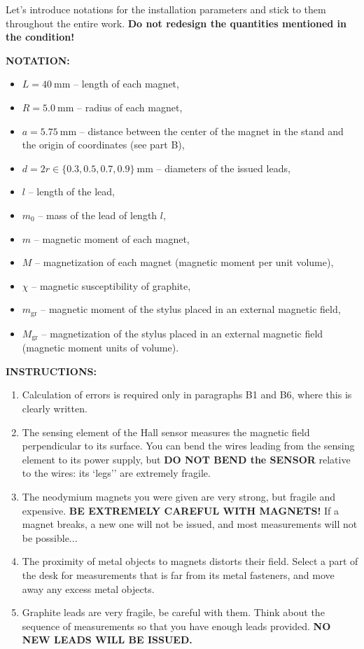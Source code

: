 \documentclass[11pt,a4paper]{article}
\begin{document}
Let's introduce notations for the installation parameters and stick to them throughout the entire work. \textbf{Do not redesign the quantities mentioned in the condition!}

\textbf{NOTATION:}
\begin{itemize}
    \item $L=40~\text{mm}$ -- length of each magnet,
    \item $R=5.0~\text{mm}$ -- radius of each magnet,
    \item $a=5.75~\text{mm}$ -- distance between the center of the magnet in the stand and the origin of coordinates (see part B),
    \item $d=2r \in \{0.3, 0.5, 0.7, 0.9\}~\text{mm}$ -- diameters of the issued leads,
    \item $l$ -- length of the lead,
    \item $m_0$ -- mass of the lead of length $l$,
    \item $m$ -- magnetic moment of each magnet,
    \item $M$ -- magnetization of each magnet (magnetic moment per unit volume),
    \item $\chi$ -- magnetic susceptibility of graphite,
    \item $m_{\text{gr}}$ -- magnetic moment of the stylus placed in an external magnetic field,
    \item $M_{\text{gr}}$ -- magnetization of the stylus placed in an external magnetic field (magnetic moment units of volume).
\end{itemize}

\textbf{INSTRUCTIONS:}
\begin{enumerate}
    \item Calculation of errors is required only in paragraphs B1 and B6, where this is clearly written.
    \item The sensing element of the Hall sensor measures the magnetic field perpendicular to its surface. You can bend the wires leading from the sensing element to its power supply, but \textbf{DO NOT BEND the SENSOR} relative to the wires: its `legs'' are extremely fragile.
    \item The neodymium magnets you were given are very strong, but fragile and expensive. \textbf{BE EXTREMELY CAREFUL WITH MAGNETS!} If a magnet breaks, a new one will not be issued, and most measurements will not be possible...
    \item The proximity of metal objects to magnets distorts their field. Select a part of the desk for measurements that is far from its metal fasteners, and move away any excess metal objects.
    \item Graphite leads are very fragile, be careful with them. Think about the sequence of measurements so that you have enough leads provided. \textbf{NO NEW LEADS WILL BE ISSUED.}
\end{enumerate}
\end{document}
